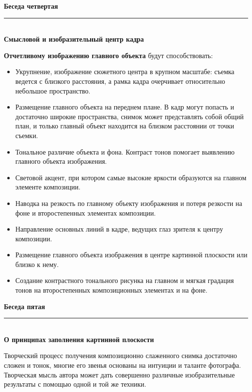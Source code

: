 \documentclass{article}
\newcommand{\important}[1]{\textbf{#1}}
\renewcommand{\section}[2]{
	\vspace{6em}
	\begin{flushright}
		\Large
		\baselineskip=0.5\baselineskip
		\textbf{#1}
		\\
		\rule[0.5\baselineskip]{\textwidth}{0.15pt}
		\\
		\textbf{#2}
	\end{flushright}
}
\begin{document}
\section{Беседа четвертая}{Смысловой и изобразительный центр кадра}
\important{Отчетливому изображению главного объекта} будут способствовать:
\begin{itemize}
	\item Укрупнение, изображение сюжетного центра в крупном масштабе: съемка ведется с близкого расстояния, а рамка кадра очерчивает относительно небольшое пространство.
	\item Размещение главного объекта на переднем плане. В кадр могут попасть и достаточно широкие пространства, снимок может представлять собой общий план, и только главный объект находится на близком расстоянии от точки съемки.
	\item Тональное различие объекта и фона. Контраст тонов помогает выявлению главного объекта изображения.
	\item Световой акцент, при котором самые высокие яркости образуются на главном элементе композиции.
	\item Наводка на резкость по главному объекту изображения и потеря резкости на фоне и второстепенных элементах композиции.
	\item Направление основных линий в кадре, ведущих глаз зрителя к центру композиции.
	\item Размещение главного объекта изображения в центре картинной плоскости или близко к нему.
	\item Создание контрастного тонального рисунка на главном и мягкая градация тонов на второстепенных композиционных элементах и на фоне.
\end{itemize}
\section{Беседа пятая}{О принципах заполнения картинной плоскости}
Творческий процесс получения композиционно слаженного снимка достаточно сложен и тонок, многие его звенья основаны на интуиции и таланте фотографа. Творческая мысль автора может дать совершенно различные изобразительные результаты с помощью одной и той же техники.
\end{document}
